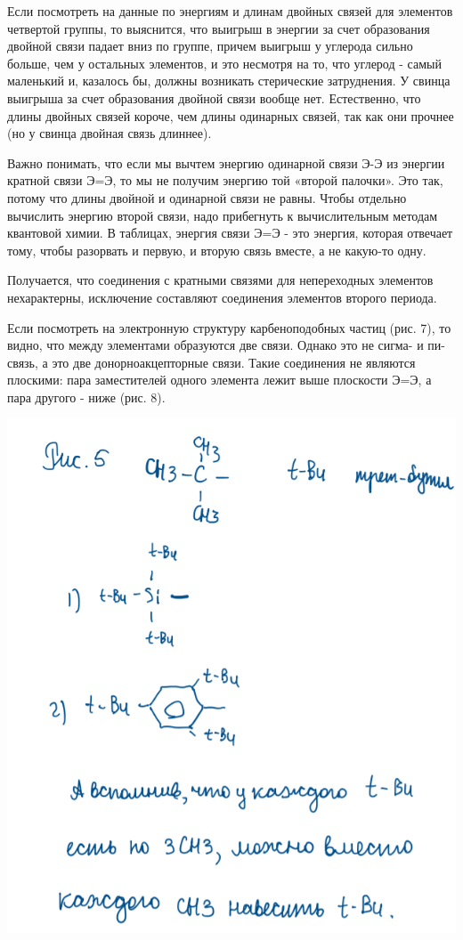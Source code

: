 Если посмотреть на данные по энергиям и длинам двойных связей для элементов четвертой группы, то выяснится, что выигрыш в энергии за счет образования двойной связи падает вниз по
группе, причем выигрыш у углерода сильно больше, чем у остальных элементов, и это несмотря на то, что углерод - самый маленький и, казалось бы, должны возникать стерические затруднения.
У свинца выигрыша за счет образования двойной связи вообще нет. Естественно, что длины двойных связей короче, чем длины одинарных связей, так как они прочнее (но у свинца двойная связь
длиннее).

Важно понимать, что если мы вычтем энергию одинарной связи Э-Э из энергии кратной связи Э=Э, то мы не получим энергию той «второй палочки». Это так, потому что длины двойной и
одинарной связи не равны. Чтобы отдельно вычислить энергию второй связи, надо прибегнуть к вычислительным методам квантовой химии. В таблицах, энергия связи Э=Э - это энергия, которая
отвечает тому, чтобы разорвать и первую, и вторую связь вместе, а не какую-то одну.

Получается, что соединения с кратными связями для непереходных элементов нехарактерны, исключение составляют соединения элементов второго периода. 

Если посмотреть на электронную структуру карбеноподобных частиц (рис. 7), то видно, что между элементами образуются две связи. Однако это не сигма- и пи-связь, а это две донорноакцепторные связи. Такие соединения не являются плоскими: пара заместителей одного элемента лежит выше плоскости Э=Э, а пара другого - ниже (рис. 8).

\includegraphics{images/14v2.png}

